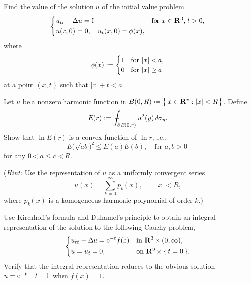 \begin{problem}
  Find the value of the solution \(u\) of the initial value problem
  \[
    \left\{
      \begin{aligned}
        &u_{tt}-\Lap u=0&&\text{for \(x\in\R^3\), \(t>0\),}\\
        &u(x,0)=0,\quad u_t(x,0)=\phi(x),
      \end{aligned}
    \right.
  \]
  where
  \[
    \phi(x)\defeq
    \begin{cases}
      1&\text{for \(|x|<a\),}\\
      0&\text{for \(|x|\geq a\)}
    \end{cases}
  \]
  at a point \((x,t)\) such that \(|x|+t<a\).
\end{problem}
\begin{solution*}
\end{solution*}

\begin{problem}
  Let \(u\) be a nonzero harmonic function in
  \(B(0,R)\defeq\bigl\{\,x\in\R^n:|x|<R\,\bigr\}\). Define
  \[
    E(r)\defeq\fint_{\partial B(0,r)}u^2(y)\diff\sigma_y.
  \]
  Show that \(\ln E(r)\) is a convex function of \(\ln r\); i.e.,
  \[
    E\bigl(\sqrt{ab}\bigr)^2\leq E(a)E(b),\quad\text{for \(a,b>0\),}
  \]
  for any \(0<a\leq c<R\).

  \noindent (\emph{Hint:} Use the representation of \(u\) as a uniformly
  convergent series
  \[
    u(x)=\sum_{k=0}^\infty p_k(x),\qquad |x|<R,
  \]
  where \(p_k(x)\) is a homogeneous harmonic polynomial of order \(k\).)
\end{problem}
\begin{solution*}
\end{solution*}

\begin{problem}
  Use Kirchhoff's formula and Duhamel's principle to obtain an integral
  representation of the solution to the following Cauchy problem,
  \[
    \left\{
      \begin{aligned}
        &u_{tt}-\Delta u=\mathrm{e}^{-t}f(x)&&\text{in \(\mathbf{R}^3\times(0,\infty)\),}\\
        &u=u_t=0,&&\text{on \(\mathbf{R}^3\times\{\,t=0\,\}\).}
      \end{aligned}
    \right.
  \]
  Verify that the integral representation reduces to the obvious solution
  \(u=\mathrm{e}^{-t}+t-1\) when \(f(x)=1\).
\end{problem}
\begin{solution*}
\end{solution*}

